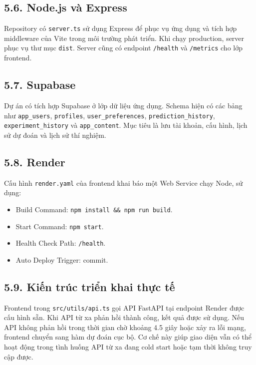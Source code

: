 \documentclass{article}
\begin{document}
	\subsection{5.6. Node.js và Express}
	\hspace{0.5cm}
	Repository có \texttt{server.ts} sử dụng Express để phục vụ ứng dụng và tích hợp middleware của Vite trong môi trường phát triển. Khi chạy production, server phục vụ thư mục \texttt{dist}. Server cũng có endpoint \texttt{/health} và \texttt{/metrics} cho lớp frontend.
	
	\subsection{5.7. Supabase}
	\hspace{0.5cm}
	Dự án có tích hợp Supabase ở lớp dữ liệu ứng dụng. Schema hiện có các bảng như \texttt{app\_users}, \texttt{profiles}, \texttt{user\_preferences}, \texttt{prediction\_history}, \texttt{experiment\_history} và \texttt{app\_content}. Mục tiêu là lưu tài khoản, cấu hình, lịch sử dự đoán và lịch sử thí nghiệm.
	
	\subsection{5.8. Render}
	\hspace{0.5cm}
	Cấu hình \texttt{render.yaml} của frontend khai báo một Web Service chạy Node, sử dụng:
	\begin{itemize}
		\item Build Command: \texttt{npm install \&\& npm run build}.
		\item Start Command: \texttt{npm start}.
		\item Health Check Path: \texttt{/health}.
		\item Auto Deploy Trigger: commit.
	\end{itemize}
	
	\subsection{5.9. Kiến trúc triển khai thực tế}
	\hspace{0.5cm}
	Frontend trong \texttt{src/utils/api.ts} gọi API FastAPI tại endpoint Render được cấu hình sẵn. Khi API từ xa phản hồi thành công, kết quả được sử dụng. Nếu API không phản hồi trong thời gian chờ khoảng 4.5 giây hoặc xảy ra lỗi mạng, frontend chuyển sang hàm dự đoán cục bộ. Cơ chế này giúp giao diện vẫn có thể hoạt động trong tình huống API từ xa đang cold start hoặc tạm thời không truy cập được.
	
\end{document}
